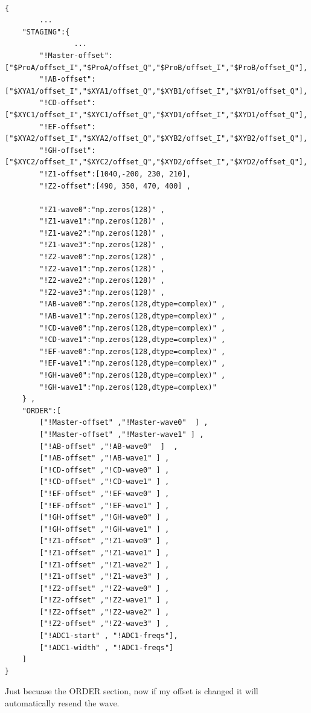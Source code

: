 \documentclass{article}
\begin{document}
\begin{lstlisting}

{
		...
    "STAGING":{
				...
        "!Master-offset":["$ProA/offset_I","$ProA/offset_Q","$ProB/offset_I","$ProB/offset_Q"],
        "!AB-offset":["$XYA1/offset_I","$XYA1/offset_Q","$XYB1/offset_I","$XYB1/offset_Q"],
        "!CD-offset":["$XYC1/offset_I","$XYC1/offset_Q","$XYD1/offset_I","$XYD1/offset_Q"],
        "!EF-offset":["$XYA2/offset_I","$XYA2/offset_Q","$XYB2/offset_I","$XYB2/offset_Q"],
        "!GH-offset":["$XYC2/offset_I","$XYC2/offset_Q","$XYD2/offset_I","$XYD2/offset_Q"],   
        "!Z1-offset":[1040,-200, 230, 210],
        "!Z2-offset":[490, 350, 470, 400] ,

        "!Z1-wave0":"np.zeros(128)" ,
        "!Z1-wave1":"np.zeros(128)" ,
        "!Z1-wave2":"np.zeros(128)" ,
        "!Z1-wave3":"np.zeros(128)" ,
        "!Z2-wave0":"np.zeros(128)" ,
        "!Z2-wave1":"np.zeros(128)" ,
        "!Z2-wave2":"np.zeros(128)" ,
        "!Z2-wave3":"np.zeros(128)" ,
        "!AB-wave0":"np.zeros(128,dtype=complex)" ,
        "!AB-wave1":"np.zeros(128,dtype=complex)" ,
        "!CD-wave0":"np.zeros(128,dtype=complex)" ,
        "!CD-wave1":"np.zeros(128,dtype=complex)" ,
        "!EF-wave0":"np.zeros(128,dtype=complex)" ,
        "!EF-wave1":"np.zeros(128,dtype=complex)" ,
        "!GH-wave0":"np.zeros(128,dtype=complex)" ,
        "!GH-wave1":"np.zeros(128,dtype=complex)" 
    } , 
    "ORDER":[
        ["!Master-offset" ,"!Master-wave0"  ] , 
        ["!Master-offset" ,"!Master-wave1" ] ,
        ["!AB-offset" ,"!AB-wave0"  ]  , 
        ["!AB-offset" ,"!AB-wave1" ] ,
        ["!CD-offset" ,"!CD-wave0" ] , 
        ["!CD-offset" ,"!CD-wave1" ] ,
        ["!EF-offset" ,"!EF-wave0" ] , 
        ["!EF-offset" ,"!EF-wave1" ] ,
        ["!GH-offset" ,"!GH-wave0" ] , 
        ["!GH-offset" ,"!GH-wave1" ] ,
        ["!Z1-offset" ,"!Z1-wave0" ] , 
        ["!Z1-offset" ,"!Z1-wave1" ] ,
        ["!Z1-offset" ,"!Z1-wave2" ] , 
        ["!Z1-offset" ,"!Z1-wave3" ] ,
        ["!Z2-offset" ,"!Z2-wave0" ] , 
        ["!Z2-offset" ,"!Z2-wave1" ] ,
        ["!Z2-offset" ,"!Z2-wave2" ] , 
        ["!Z2-offset" ,"!Z2-wave3" ] ,  
        ["!ADC1-start" , "!ADC1-freqs"],
        ["!ADC1-width" , "!ADC1-freqs"]
    ]
}

\end{lstlisting}
Just becuase the ORDER section, now if my offset is changed
it will automatically resend the wave.
\end{document}
